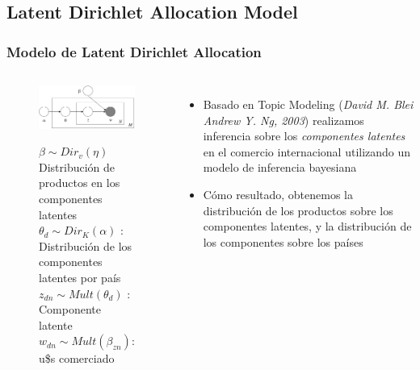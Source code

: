 \documentclass[compress]{beamer}
\begin{document}
\subsection{Latent Dirichlet Allocation Model}
\begin{frame}

\frametitle{Modelo de Latent Dirichlet Allocation}

\begin{columns}[c] 

\begin{figure}
\includegraphics[width=\linewidth]{grafo}

\medskip
\tiny
$\beta \sim Dir_v(\eta)$  Distribución de productos en los componentes latentes\\
$\theta_d \sim Dir_K(\alpha)$ : Distribución de los componentes latentes por país\\
$z_{dn} \sim Mult(\theta_d)$ : Componente latente \\
$w_{dn} \sim Mult(\beta_{zn})$: u\$s comerciado

\end{figure}

\small

\begin{itemize}
	
	\item[\faRebel] Basado en Topic Modeling  (\textit{David M. Blei Andrew Y. Ng, 2003}) realizamos inferencia sobre los \textit{componentes latentes} en el comercio internacional utilizando un modelo de inferencia bayesiana
	\item[\faRebel] Cómo resultado, obtenemos la distribución de los productos sobre los componentes latentes, y la distribución de los componentes sobre los países
\end{itemize}

\end{columns}
\end{frame}
\end{document}
